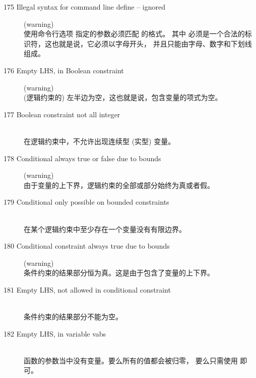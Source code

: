 \begin{description}
%
%
\item[175 Illegal syntax for command line define  --
  ignored] (warning)\\
  使用命令行选项  指定的参数必须匹配  的格式。
  其中  必须是一个合法的标识符，这也就是说，它必须以字母开头，
  并且只能由字母、数字和下划线组成。
%
%
\item[176 Empty LHS, in Boolean constraint] (warning)\ \\
  (逻辑约束的) 左半边为空，这也就是说，包含变量的项式为空。
\item[177 Boolean constraint not all integer]\ \\
  在逻辑约束中，不允许出现连续型 (实型) 变量。 
\item[178 Conditional always true or false due to bounds] (warning)\ \\
  由于变量的上下界，逻辑约束的全部或部分始终为真或者假。
\item[179 Conditional only possible on bounded constraints]\ \\
  在某个逻辑约束中至少存在一个变量没有有限边界。
\item[180 Conditional constraint always true due to bounds] (warning)\ \\
  条件约束的结果部分恒为真。这是由于包含了变量的上下界。
\item[181 Empty LHS, not allowed in conditional constraint]\ \\
  条件约束的结果部分不能为空。
\item[182 Empty LHS, in variable vabs]\ \\
   函数的参数当中没有变量。要么所有的值都会被归零，
  要么只需使用  即可。

\end{description}
